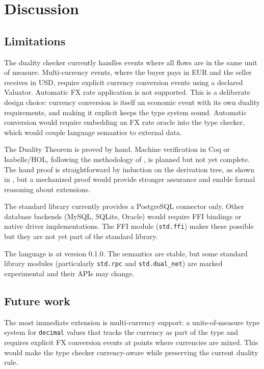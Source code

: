 \documentclass[11pt,a4paper]{article}
\theoremstyle{remark}
\begin{document}
\section{Discussion}\label{sec:discussion}

\subsection{Limitations}

The duality checker currently handles events where all flows are in
the same unit of measure. Multi-currency events, where the buyer pays
in EUR and the seller receives in USD, require explicit currency
conversion events using a declared Valuator. Automatic FX rate
application is not supported. This is a deliberate design choice:
currency conversion is itself an economic event with its own duality
requirements, and making it explicit keeps the type system sound.
Automatic conversion would require embedding an FX rate oracle into
the type checker, which would couple language semantics to external
data.

The Duality Theorem is proved by hand. Machine verification in Coq or
Isabelle/HOL, following the methodology of \citet{klein_machine-checked_2006},
is planned but not yet complete. The hand proof is straightforward by
induction on the derivation tree, as shown in
, but a mechanized proof would provide stronger
assurance and enable formal reasoning about extensions.

The standard library currently provides a PostgreSQL connector only.
Other database backends (MySQL, SQLite, Oracle) would require FFI
bindings or native driver implementations. The FFI module
(\texttt{std.ffi}) makes these possible but they are not yet part of
the standard library.

The language is at version 0.1.0. The semantics are stable, but some
standard library modules (particularly \texttt{std.rpc} and
\texttt{std.dual\_net}) are marked experimental and their APIs may
change.

\subsection{Future work}

The most immediate extension is multi-currency support: a
units-of-measure type system for \texttt{decimal} values that tracks
the currency as part of the type and requires explicit FX conversion
events at points where currencies are mixed. This would make the type
checker currency-aware while preserving the current duality rule.
\end{document}
